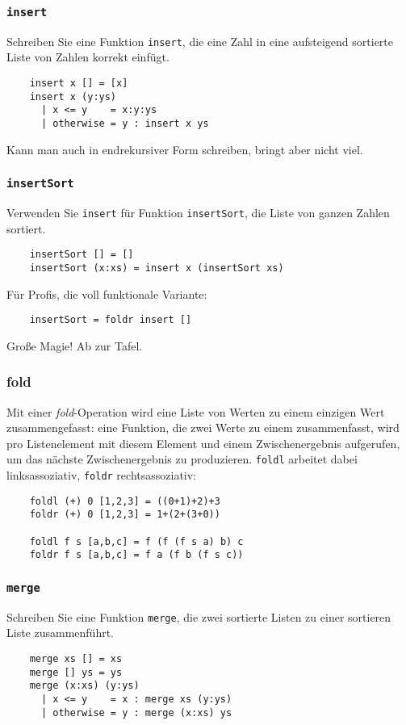 \documentclass{beamer}
\begin{document}
\begin{frame}[fragile]
  \frametitle{\lstinline{insert}}
  Schreiben Sie eine Funktion \lstinline{insert}, die eine Zahl in eine aufsteigend sortierte Liste von Zahlen korrekt einfügt.
  \pause
  \begin{lstlisting}
    insert x [] = [x]
    insert x (y:ys)
      | x <= y    = x:y:ys
      | otherwise = y : insert x ys
  \end{lstlisting}
  Kann man auch in endrekursiver Form schreiben, bringt aber nicht viel.
\end{frame}

\begin{frame}[fragile]
  \frametitle{\lstinline{insertSort}}
  Verwenden Sie \lstinline{insert} für Funktion \lstinline{insertSort}, die Liste von ganzen Zahlen sortiert.
  \pause
  \begin{lstlisting}
    insertSort [] = []
    insertSort (x:xs) = insert x (insertSort xs)
  \end{lstlisting}
  \pause
  Für Profis, die voll funktionale Variante:
  \pause
  \begin{lstlisting}
    insertSort = foldr insert []
  \end{lstlisting}
  Große Magie! Ab zur Tafel.
\end{frame}

\begin{frame}[fragile]
  \frametitle{fold}
  Mit einer \emph{fold}-Operation wird eine Liste von Werten zu einem einzigen Wert zusammengefasst:
  eine Funktion, die zwei Werte zu einem zusammenfasst, wird pro Listenelement mit diesem Element und einem Zwischenergebnis aufgerufen,
  um das nächste Zwischenergebnis zu produzieren.
  \lstinline{foldl} arbeitet dabei linksassoziativ, \lstinline{foldr} rechtsassoziativ:
  \begin{lstlisting}
    foldl (+) 0 [1,2,3] = ((0+1)+2)+3
    foldr (+) 0 [1,2,3] = 1+(2+(3+0))
    
    foldl f s [a,b,c] = f (f (f s a) b) c
    foldr f s [a,b,c] = f a (f b (f s c))
  \end{lstlisting}
\end{frame}

\begin{frame}[fragile]
  \frametitle{\lstinline{merge}}
  Schreiben Sie eine Funktion \lstinline{merge}, die zwei sortierte Listen zu einer sortieren Liste zusammenführt.
  \pause
  \begin{lstlisting}
    merge xs [] = xs
    merge [] ys = ys
    merge (x:xs) (y:ys)
      | x <= y    = x : merge xs (y:ys)
      | otherwise = y : merge (x:xs) ys
  \end{lstlisting}
\end{frame}
\end{document}
